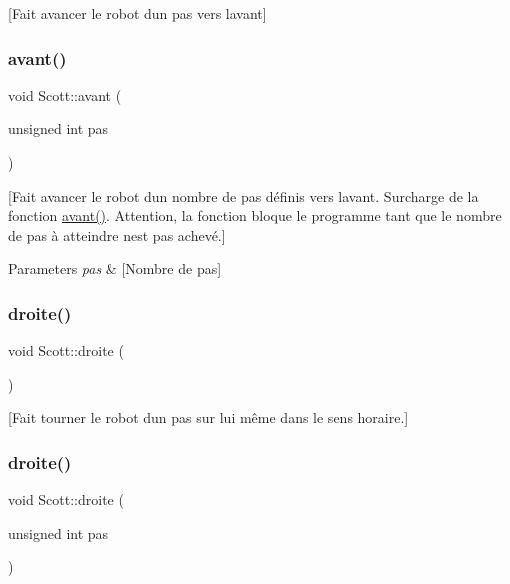 \mbox{[}Fait avancer le robot d\textquotesingle{}un pas vers l\textquotesingle{}avant\mbox{]} \hypertarget{class_scott_ae7e476d962f7e2ecc8dc6daeb5d96445}{}\label{class_scott_ae7e476d962f7e2ecc8dc6daeb5d96445} 
\subsubsection{\texorpdfstring{avant()}{avant()}\hspace{0.1cm}{\footnotesize\ttfamily [2/2]}}
{\footnotesize\ttfamily void Scott\+::avant (\begin{DoxyParamCaption}\item[{unsigned int}]{pas }\end{DoxyParamCaption})}

\mbox{[}Fait avancer le robot d\textquotesingle{}un nombre de pas définis vers l\textquotesingle{}avant. Surcharge de la fonction \hyperlink{class_scott_aba59b4c4ed89d7c2ce178498a177f5ed}{avant()}. Attention, la fonction bloque le programme tant que le nombre de pas à atteindre n\textquotesingle{}est pas achevé.\mbox{]} 
\begin{DoxyParams}{Parameters}
{\em pas} & \mbox{[}Nombre de pas\mbox{]} \\
\hline
\end{DoxyParams}
\hypertarget{class_scott_aa3619ee2b7866d3274818347f10578ed}{}\label{class_scott_aa3619ee2b7866d3274818347f10578ed} 
\subsubsection{\texorpdfstring{droite()}{droite()}\hspace{0.1cm}{\footnotesize\ttfamily [1/2]}}
{\footnotesize\ttfamily void Scott\+::droite (\begin{DoxyParamCaption}{ }\end{DoxyParamCaption})}

\mbox{[}Fait tourner le robot d\textquotesingle{}un pas sur lui même dans le sens horaire.\mbox{]} \hypertarget{class_scott_a459a0036b30c72a47ec84dd1e9e8023b}{}\label{class_scott_a459a0036b30c72a47ec84dd1e9e8023b} 
\subsubsection{\texorpdfstring{droite()}{droite()}\hspace{0.1cm}{\footnotesize\ttfamily [2/2]}}
{\footnotesize\ttfamily void Scott\+::droite (\begin{DoxyParamCaption}\item[{unsigned int}]{pas }\end{DoxyParamCaption})}


